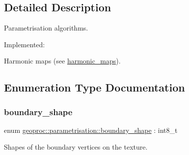\subsection{Detailed Description}
Parametrisation algorithms. 

Implemented\+:
\begin{DoxyItemize}
\item Harmonic maps (see \hyperlink{namespacegeoproc_1_1parametrisation_aa73e02d994e3ef3eba0fcfc5863c8416}{harmonic\+\_\+maps}). 
\end{DoxyItemize}

\subsection{Enumeration Type Documentation}
\mbox{\label{namespacegeoproc_1_1parametrisation_a7f001bf497830114e8aea2c884a948b7}} 
\subsubsection{\texorpdfstring{boundary\+\_\+shape}{boundary\_shape}}
{\footnotesize\ttfamily enum \hyperlink{namespacegeoproc_1_1parametrisation_a7f001bf497830114e8aea2c884a948b7}{geoproc\+::parametrisation\+::boundary\+\_\+shape} \+: int8\+\_\+t\hspace{0.3cm}{\ttfamily [strong]}}



Shapes of the boundary vertices on the texture. 



